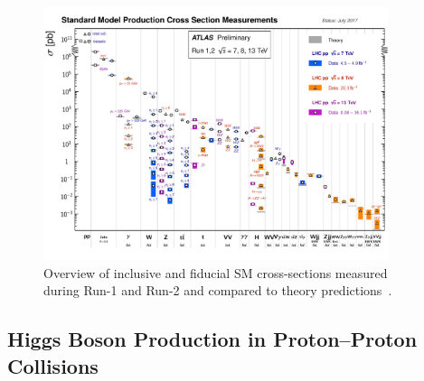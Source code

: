 \begin{figure}[htb]
    \centering
    \includegraphics[width=0.9\textwidth]{./figures/theory/sm_xsec.eps}
    \caption{Overview of inclusive and fiducial SM cross-sections measured during Run-1 and Run-2 and compared to theory predictions~\cite{SMPublicResults}.}\label{fig:theory:higgs:smxsec}
\end{figure}

\subsection{Higgs Boson Production in Proton--Proton Collisions}\label{sub:theory:higgs:production}

